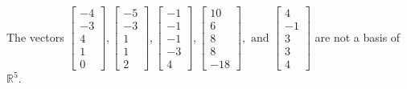 \begin{exercise}
\begin{exerciseStatement}
  \end{exerciseStatement}
  \begin{exerciseAnswer}
   The vectors \(\left[\begin{array}{r}
-4 \\
-3 \\
4 \\
1 \\
0
\end{array}\right] , \left[\begin{array}{r}
-5 \\
-3 \\
1 \\
1 \\
2
\end{array}\right] , \left[\begin{array}{r}
-1 \\
-1 \\
-1 \\
-3 \\
4
\end{array}\right] , \left[\begin{array}{r}
10 \\
6 \\
8 \\
8 \\
-18
\end{array}\right] , \text{ and } \left[\begin{array}{r}
4 \\
-1 \\
3 \\
3 \\
4
\end{array}\right]\) 
  	 are not  a basis of \(\mathbb{R}^5\).
  


  \end{exerciseAnswer}
\end{exercise}